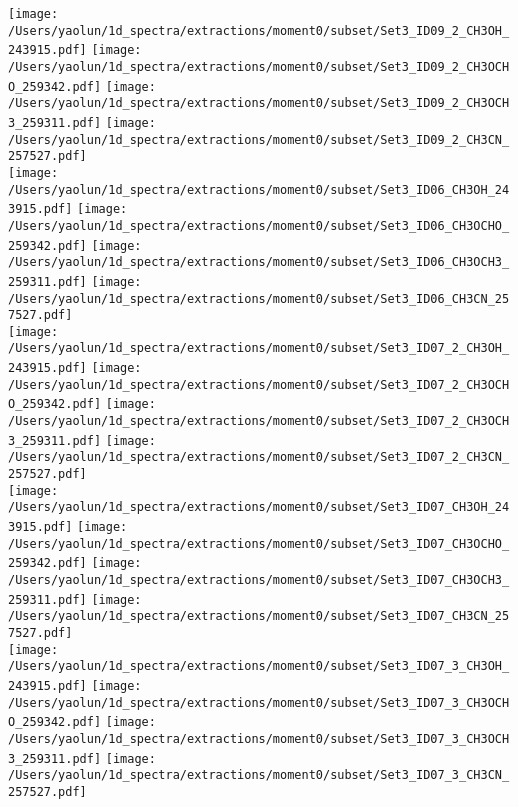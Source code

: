 \addtocounter{figure}{-1}
\begin{figure*}[htbp!]
  \centering
  \texttt{[image: /Users/yaolun/1d\_spectra/extractions/moment0/subset/Set3\_ID09\_2\_CH3OH\_243915.pdf]}
  \texttt{[image: /Users/yaolun/1d\_spectra/extractions/moment0/subset/Set3\_ID09\_2\_CH3OCHO\_259342.pdf]}
  \texttt{[image: /Users/yaolun/1d\_spectra/extractions/moment0/subset/Set3\_ID09\_2\_CH3OCH3\_259311.pdf]}
  \texttt{[image: /Users/yaolun/1d\_spectra/extractions/moment0/subset/Set3\_ID09\_2\_CH3CN\_257527.pdf]}
  \\
  \texttt{[image: /Users/yaolun/1d\_spectra/extractions/moment0/subset/Set3\_ID06\_CH3OH\_243915.pdf]}
  \texttt{[image: /Users/yaolun/1d\_spectra/extractions/moment0/subset/Set3\_ID06\_CH3OCHO\_259342.pdf]}
  \texttt{[image: /Users/yaolun/1d\_spectra/extractions/moment0/subset/Set3\_ID06\_CH3OCH3\_259311.pdf]}
  \texttt{[image: /Users/yaolun/1d\_spectra/extractions/moment0/subset/Set3\_ID06\_CH3CN\_257527.pdf]}
  \\
  \texttt{[image: /Users/yaolun/1d\_spectra/extractions/moment0/subset/Set3\_ID07\_2\_CH3OH\_243915.pdf]}
  \texttt{[image: /Users/yaolun/1d\_spectra/extractions/moment0/subset/Set3\_ID07\_2\_CH3OCHO\_259342.pdf]}
  \texttt{[image: /Users/yaolun/1d\_spectra/extractions/moment0/subset/Set3\_ID07\_2\_CH3OCH3\_259311.pdf]}
  \texttt{[image: /Users/yaolun/1d\_spectra/extractions/moment0/subset/Set3\_ID07\_2\_CH3CN\_257527.pdf]}
  \\
  \texttt{[image: /Users/yaolun/1d\_spectra/extractions/moment0/subset/Set3\_ID07\_CH3OH\_243915.pdf]}
  \texttt{[image: /Users/yaolun/1d\_spectra/extractions/moment0/subset/Set3\_ID07\_CH3OCHO\_259342.pdf]}
  \texttt{[image: /Users/yaolun/1d\_spectra/extractions/moment0/subset/Set3\_ID07\_CH3OCH3\_259311.pdf]}
  \texttt{[image: /Users/yaolun/1d\_spectra/extractions/moment0/subset/Set3\_ID07\_CH3CN\_257527.pdf]}
  \\
  \texttt{[image: /Users/yaolun/1d\_spectra/extractions/moment0/subset/Set3\_ID07\_3\_CH3OH\_243915.pdf]}
  \texttt{[image: /Users/yaolun/1d\_spectra/extractions/moment0/subset/Set3\_ID07\_3\_CH3OCHO\_259342.pdf]}
  \texttt{[image: /Users/yaolun/1d\_spectra/extractions/moment0/subset/Set3\_ID07\_3\_CH3OCH3\_259311.pdf]}
  \texttt{[image: /Users/yaolun/1d\_spectra/extractions/moment0/subset/Set3\_ID07\_3\_CH3CN\_257527.pdf]}
  \\
  \caption{}
\end{figure*}

